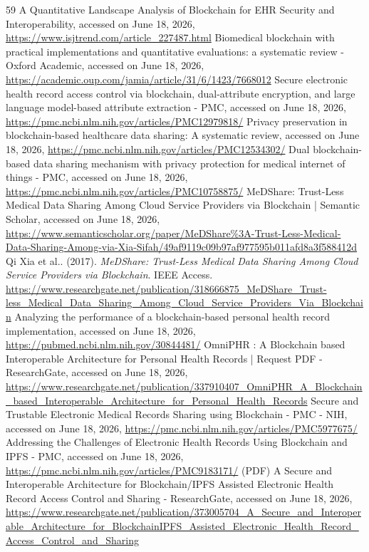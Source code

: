 \documentclass[12pt]{article}
\begin{document}
\begin{sloppypar}
\begin{thebibliography}{59}
 A Quantitative Landscape Analysis of Blockchain for EHR Security and Interoperability, accessed on June 18, 2026, \url{https://www.isjtrend.com/article_227487.html}
 Biomedical blockchain with practical implementations and quantitative evaluations: a systematic review - Oxford Academic, accessed on June 18, 2026, \url{https://academic.oup.com/jamia/article/31/6/1423/7668012}
 Secure electronic health record access control via blockchain, dual-attribute encryption, and large language model-based attribute extraction - PMC, accessed on June 18, 2026, \url{https://pmc.ncbi.nlm.nih.gov/articles/PMC12979818/}
 Privacy preservation in blockchain-based healthcare data sharing: A systematic review, accessed on June 18, 2026, \url{https://pmc.ncbi.nlm.nih.gov/articles/PMC12534302/}
 Dual blockchain-based data sharing mechanism with privacy protection for medical internet of things - PMC, accessed on June 18, 2026, \url{https://pmc.ncbi.nlm.nih.gov/articles/PMC10758875/}
 MeDShare: Trust-Less Medical Data Sharing Among Cloud Service Providers via Blockchain | Semantic Scholar, accessed on June 18, 2026, \url{https://www.semanticscholar.org/paper/MeDShare%3A-Trust-Less-Medical-Data-Sharing-Among-via-Xia-Sifah/49af9119c09b97af977595b011afd8a3f588412d}
 Qi Xia et al.. (2017). \textit{MeDShare: Trust-Less Medical Data Sharing Among Cloud Service Providers via Blockchain}. IEEE Access. \url{https://www.researchgate.net/publication/318666875_MeDShare_Trust-less_Medical_Data_Sharing_Among_Cloud_Service_Providers_Via_Blockchain}
 Analyzing the performance of a blockchain-based personal health record implementation, accessed on June 18, 2026, \url{https://pubmed.ncbi.nlm.nih.gov/30844481/}
 OmniPHR : A Blockchain based Interoperable Architecture for Personal Health Records | Request PDF - ResearchGate, accessed on June 18, 2026, \url{https://www.researchgate.net/publication/337910407_OmniPHR_A_Blockchain_based_Interoperable_Architecture_for_Personal_Health_Records}
 Secure and Trustable Electronic Medical Records Sharing using Blockchain - PMC - NIH, accessed on June 18, 2026, \url{https://pmc.ncbi.nlm.nih.gov/articles/PMC5977675/}
 Addressing the Challenges of Electronic Health Records Using Blockchain and IPFS - PMC, accessed on June 18, 2026, \url{https://pmc.ncbi.nlm.nih.gov/articles/PMC9183171/}
 (PDF) A Secure and Interoperable Architecture for Blockchain/IPFS Assisted Electronic Health Record Access Control and Sharing - ResearchGate, accessed on June 18, 2026, \url{https://www.researchgate.net/publication/373005704_A_Secure_and_Interoperable_Architecture_for_BlockchainIPFS_Assisted_Electronic_Health_Record_Access_Control_and_Sharing}

\end{thebibliography}
\end{sloppypar}
\end{document}
